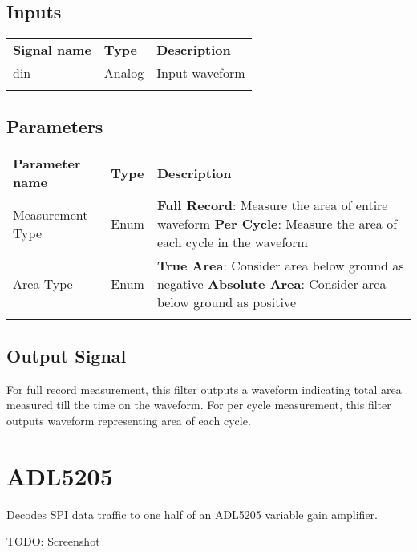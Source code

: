 \subsection{Inputs}

\begin{tabularx}{16cm}{llX}
\thickhline
\textbf{Signal name} & \textbf{Type} & \textbf{Description} \\
\thickhline
din & Analog & Input waveform \\
\thickhline
\end{tabularx}

\subsection{Parameters}

\begin{tabularx}{16cm}{llX}
\thickhline
\textbf{Parameter name} & \textbf{Type} & \textbf{Description} \\
\thickhline
Measurement Type & Enum &
	\textbf{Full Record}: Measure the area of entire waveform \newline
	\textbf{Per Cycle}: Measure the area of each cycle in the waveform\\
\thinhline
Area Type & Enum &
	\textbf{True Area}: Consider area below ground as negative\newline
	\textbf{Absolute Area}: Consider area below ground as positive\\
\thickhline
\end{tabularx}

\subsection{Output Signal}

For full record measurement, this filter outputs a waveform indicating total area measured till the time on the waveform.
For per cycle measurement, this filter outputs waveform representing area of each cycle.

\pagebreak
\section{ADL5205}
\label{filter:adl5205}

Decodes SPI data traffic to one half of an ADL5205 variable gain amplifier.

TODO: Screenshot

